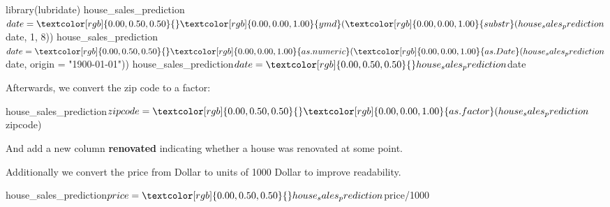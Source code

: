 \documentclass[12pt,]{scrbook}
\newenvironment{Shaded}{}{}
\newcommand{\CommentTok}[1]{\textcolor[rgb]{0.00,0.50,0.00}{#1}}
\newcommand{\DataTypeTok}[1]{#1}
\newcommand{\DecValTok}[1]{#1}
\newcommand{\KeywordTok}[1]{\textcolor[rgb]{0.00,0.00,1.00}{#1}}
\newcommand{\NormalTok}[1]{#1}
\newcommand{\OperatorTok}[1]{#1}
\newcommand{\OtherTok}[1]{\textcolor[rgb]{1.00,0.25,0.00}{#1}}
\newcommand{\StringTok}[1]{\textcolor[rgb]{0.00,0.50,0.50}{#1}}
\begin{document}
\begin{Shaded}
\begin{Highlighting}[]
\KeywordTok{library}\NormalTok{(lubridate)}
\NormalTok{house_sales_prediction}\OperatorTok{$}\NormalTok{date =}\StringTok{ }\KeywordTok{ymd}\NormalTok{(}\KeywordTok{substr}\NormalTok{(house_sales_prediction}\OperatorTok{$}\NormalTok{date, }
  \DecValTok{1}\NormalTok{, }\DecValTok{8}\NormalTok{))}
\NormalTok{house_sales_prediction}\OperatorTok{$}\NormalTok{date =}\StringTok{ }\KeywordTok{as.numeric}\NormalTok{(}\KeywordTok{as.Date}\NormalTok{(house_sales_prediction}\OperatorTok{$}\NormalTok{date, }
  \DataTypeTok{origin =} \StringTok{"1900-01-01"}\NormalTok{))}
\NormalTok{house_sales_prediction}\OperatorTok{$}\NormalTok{date =}\StringTok{ }\NormalTok{house_sales_prediction}\OperatorTok{$}\NormalTok{date}
\end{Highlighting}
\end{Shaded}

Afterwards, we convert the zip code to a factor:

\begin{Shaded}
\begin{Highlighting}[]
\NormalTok{house_sales_prediction}\OperatorTok{$}\NormalTok{zipcode =}\StringTok{ }\KeywordTok{as.factor}\NormalTok{(house_sales_prediction}\OperatorTok{$}\NormalTok{zipcode)}
\end{Highlighting}
\end{Shaded}

And add a new column \textbf{renovated} indicating whether a house was renovated at some point.

\begin{Shaded}
\end{Shaded}

Additionally we convert the price from Dollar to units of 1000 Dollar to improve readability.

\begin{Shaded}
\begin{Highlighting}[]
\NormalTok{house_sales_prediction}\OperatorTok{$}\NormalTok{price =}\StringTok{ }\NormalTok{house_sales_prediction}\OperatorTok{$}\NormalTok{price}\OperatorTok{/}\DecValTok{1000}
\end{Highlighting}
\end{Shaded}
\end{document}
